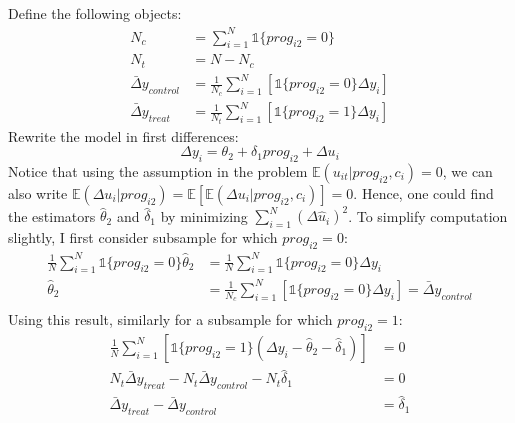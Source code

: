 \documentclass[]{article}
\begin{document}
\subsection{}
Define the following objects:
\begin{equation}
	\begin{split}
		N_c& = \sum\limits_{i = 1}^N\mathds{1}\{{prog}_{i2} = 0\} \\ \nonumber
		N_t& = N - N_c \\
		\bar{\Delta}y_{control}& = \frac{1}{N_c}\sum\limits_{i = 1}^N\left[\mathds{1}\{{prog}_{i2} = 0\}\Delta y_i\right] \\
		\bar{\Delta}y_{treat}& = \frac{1}{N_t}\sum\limits_{i = 1}^N\left[\mathds{1}\{{prog}_{i2} = 1\}\Delta y_i\right]
	\end{split}
\end{equation}
Rewrite the model in first differences:
\begin{equation}
	\Delta y_i = \theta_2 + \delta_1 {prog}_{i2} + \Delta u_i \nonumber
\end{equation}
Notice that using the assumption in the problem $\mathbb{E}(u_{it}|{prog}_{i2}, c_i) = 0$, we can also write $\mathbb{E}(\Delta u_i|{prog}_{i2}) = \mathbb{E}\left[\mathbb{E}(\Delta u_i|{prog}_{i2}, c_i)\right] = 0$. Hence, one could find the estimators $\hat{\theta}_2$ and $\hat{\delta}_1$ by minimizing $\sum\limits_{i = 1}^N\left(\Delta\hat{u}_i\right)^2$. To simplify computation slightly, I first consider subsample for which ${prog}_{i2} = 0$:
\begin{equation}
	\begin{split}
		\frac{1}{N}\sum\limits_{i = 1}^N\mathds{1}\{{prog}_{i2} = 0\}\hat{\theta}_2& = \frac{1}{N}\sum\limits_{i = 1}^N\mathds{1}\{{prog}_{i2} = 0\}\Delta y_i \\
		\hat{\theta}_2& = \frac{1}{N_c}\sum\limits_{i = 1}^N\left[\mathds{1}\{{prog}_{i2} = 0\}\Delta y_i\right] = \bar{\Delta}y_{control}\\ \nonumber
	\end{split}
\end{equation}
Using this result, similarly for a subsample for which ${prog}_{i2} = 1$:
\begin{equation}
	\begin{split}
		\frac{1}{N}\sum\limits_{i = 1}^N\left[\mathds{1}\{{prog}_{i2} = 1\}(\Delta y_i - \hat{\theta}_2 - \hat{\delta}_1)\right]& = 0 \\ \nonumber
		N_t\bar{\Delta}y_{treat} - N_t\bar{\Delta}y_{control} - N_t\hat{\delta}_1& = 0 \\
		\bar{\Delta}y_{treat} - \bar{\Delta}y_{control}& = \hat{\delta}_1
	\end{split}
\end{equation}
\end{document}
